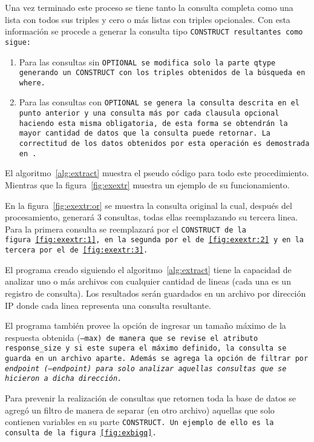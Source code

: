 Una vez terminado este proceso se tiene tanto la consulta completa como una
lista con todos sus triples y cero o más listas con triples opcionales.
Con esta información se procede a generar la consulta tipo \tt{CONSTRUCT}
resultantes como sigue:
\begin{enumerate}
  \item
    Para las consultas sin \tt{OPTIONAL} se modifica solo la parte \tt{qtype}
    generando un \tt{CONSTRUCT} con los triples obtenidos de la búsqueda en
    \tt{where}.
  \item
    Para las consultas con \tt{OPTIONAL} se genera la consulta descrita en el
    punto anterior y una consulta más por cada clausula opcional haciendo esta
    misma obligatoria, de esta forma se obtendrán la mayor cantidad de datos
    que la consulta puede retornar.
    La correctitud de los datos obtenidos por esta operación es demostrada
		en~\cite{perez2006semantics}.
\end{enumerate}

El algoritmo~\ref{alg:extract} muestra el pseudo código para todo este
procedimiento. Mientras que la figura~\ref{fig:exextr} muestra un ejemplo de
su funcionamiento.



En la figura~\ref{fig:exextr:or} se muestra la consulta original la cual,
después del procesamiento, generará 3 consultas, todas ellas reemplazando su
tercera linea. Para la primera consulta se reemplazará por el \tt{CONSTRUCT} de
la figura~\ref{fig:exextr:1}, en la segunda por el de~\ref{fig:exextr:2} y en la
tercera por el de~\ref{fig:exextr:3}.



El programa creado siguiendo el algoritmo~\ref{alg:extract} tiene la capacidad
de analizar uno o más archivos con cualquier cantidad de lineas
(cada una es un registro de consulta).
Los resultados serán guardados en un archivo por dirección IP donde cada linea
representa una consulta resultante.

El programa también provee la opción de ingresar un tamaño máximo de la 
respuesta obtenida (\tt{--max}) de manera que se revise el atributo 
\tt{response\_size} y si este supera el máximo definido, la consulta se guarda
en un archivo aparte.
Además se agrega la opción de filtrar por \it{endpoint} (\tt{--endpoint}) para 
solo analizar aquellas consultas que se hicieron a dicha dirección.

Para prevenir la realización de consultas que retornen toda la base de datos se
agregó un filtro de manera de separar (en otro archivo) aquellas que solo
contienen variables en su parte \tt{CONSTRUCT}. Un ejemplo de ello es la
consulta de la figura~\ref{fig:exbigq}.

